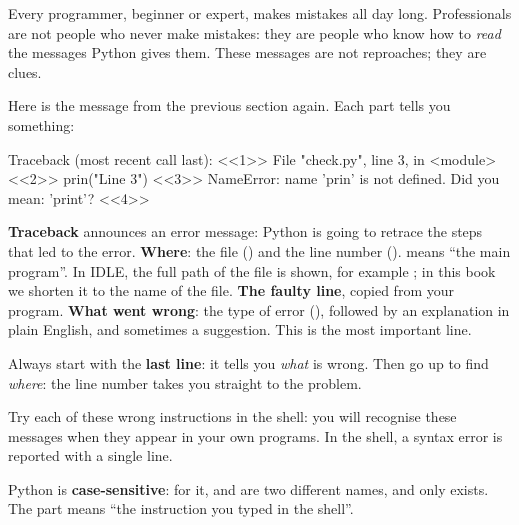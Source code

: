 
Every programmer, beginner or expert, makes mistakes all day long. Professionals are not people who
never make mistakes: they are people who know how to \emph{read} the messages Python gives them.
These messages are not reproaches; they are clues.

Here is the message from the previous section again. Each part tells you something:

\sortielibre
\begin{erreur}
Traceback (most recent call last):  <<1>>
  File "check.py", line 3, in <module>  <<2>>
    prin("Line 3")  <<3>>
NameError: name 'prin' is not defined. Did you mean: 'print'?  <<4>>
\end{erreur}

\begin{renvois}
 \textbf{Traceback} announces an error message: Python is going to retrace the steps that
  led to the error.
 \textbf{Where}: the file () and the line number (). 
  means \enquote{the main program}. In IDLE, the full path of the file is shown, for example
  ;
  in this book we shorten it to the name of the file.
 \textbf{The faulty line}, copied from your program.
 \textbf{What went wrong}: the type of error (), followed by an explanation
  in plain English, and sometimes a suggestion. This is the most important line.
\end{renvois}

\begin{regle}
Always start with the \textbf{last line}: it tells you \emph{what} is wrong. Then go up to find
\emph{where}: the line number takes you straight to the problem.
\end{regle}

Try each of these wrong instructions in the shell: you will recognise these messages when they
appear in your own programs. In the shell, a syntax error is reported with a single line.

Python is \textbf{case-sensitive}: for it,  and  are two different names, and
only  exists. The  part means \enquote{the instruction you typed in the
shell}.

